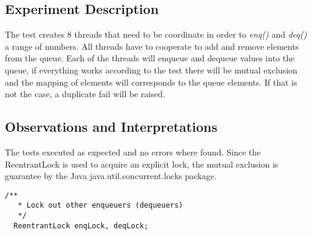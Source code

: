 \subsection{Experiment Description} 
\par
The test creates $8$ threads that need to be coordinate in order to \textit{enq()} and \textit{deq()} a range of numbers. All threads have to cooperate to add and remove elements from the queue. Each of the threads will enqueue and dequeue values into the queue, if everything works according to the test there will be mutual exclusion and the mapping of elements will corresponds to the queue elements.
If that is not the case, a duplicate fail will be raised.
\par



\subsection{Observations and Interpretations}

\par
The tests executed as expected and no errors where found. Since the ReentrantLock is used to acquire an explicit lock, the mutual exclusion is guarantee by the Java java.util.concurrent.locks package.

\begin{lstlisting}[frame=single,breaklines=true]
  /**
   * Lock out other enqueuers (dequeuers)
   */
  ReentrantLock enqLock, deqLock;
\end{lstlisting}




